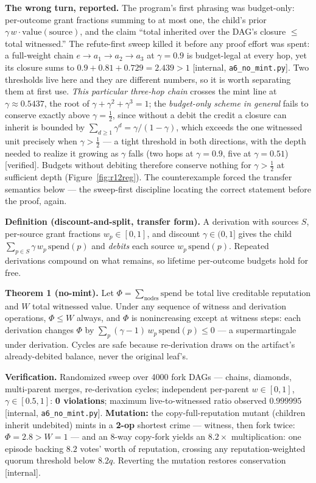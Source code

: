 \documentclass[11pt,a4paper]{article}
\begin{document}
\textbf{The wrong turn, reported.} The program's first phrasing was budget-only: per-outcome grant fractions summing to at most
one, the child's prior $\gamma\, w\cdot\mathrm{value}(\text{source})$, and the claim ``total inherited over the DAG's closure
$\le$ total witnessed.'' The refute-first sweep killed it before any proof effort was spent: a full-weight chain
$e\to a_1\to a_2\to a_3$ at $\gamma=0.9$ is budget-legal at every hop, yet its closure sums to $0.9+0.81+0.729=2.439>1$ [internal,
\texttt{a6\_no\_mint.py}]. Two thresholds live here and they are different numbers, so it is worth separating them at first use.
\emph{This particular three-hop chain} crosses the mint line at $\gamma\approx0.5437$, the root of $\gamma+\gamma^2+\gamma^3=1$;
the \emph{budget-only scheme in general} fails to conserve exactly above $\gamma=\tfrac12$, since without a debit the credit a
closure can inherit is bounded by $\sum_{d\ge1}\gamma^d=\gamma/(1-\gamma)$, which exceeds the one witnessed unit precisely when
$\gamma>\tfrac12$ --- a tight threshold in both directions, with the depth needed to realize it growing as $\gamma$ falls (two hops
at $\gamma=0.9$, five at $\gamma=0.51$) [verified]. Budgets without debiting therefore conserve nothing for $\gamma>\tfrac12$ at
sufficient depth (Figure~\ref{fig:r12reg}). The counterexample forced the transfer
semantics below --- the sweep-first discipline locating the correct statement before the proof, again.

\begin{thebox}
\textbf{Definition (discount-and-split, transfer form).} A derivation with sources $S$, per-source grant fractions $w_p\in[0,1]$,
and discount $\gamma\in(0,1]$ gives the child $\sum_{p\in S}\gamma\,w_p\,\mathrm{spend}(p)$ and \emph{debits} each source
$w_p\,\mathrm{spend}(p)$. Repeated derivations compound on what remains, so lifetime per-outcome budgets hold for free.

\textbf{Theorem 1 (no-mint).} Let $\Phi=\sum_{\text{nodes}}\mathrm{spend}$ be total live creditable reputation and $W$ total
witnessed value. Under any sequence of witness and derivation operations, $\Phi\le W$ always, and $\Phi$ is nonincreasing except at
witness steps: each derivation changes $\Phi$ by $\sum_p(\gamma-1)\,w_p\,\mathrm{spend}(p)\le 0$ --- a supermartingale under
derivation. Cycles are safe because re-derivation draws on the artifact's already-debited balance, never the original leaf's.

\textbf{Verification.} Randomized sweep over 4000 fork DAGs --- chains, diamonds, multi-parent merges, re-derivation cycles;
independent per-parent $w\in[0,1]$, $\gamma\in[0.5,1]$: \textbf{0 violations}; maximum live-to-witnessed ratio observed $0.999995$
[internal, \texttt{a6\_no\_mint.py}]. \textbf{Mutation:} the copy-full-reputation mutant (children inherit undebited) mints in a
\textbf{2-op} shortest crime --- witness, then fork twice: $\Phi=2.8>W=1$ --- and an 8-way copy-fork yields an $8.2\times$
multiplication: one episode backing $8.2$ votes' worth of reputation, crossing any reputation-weighted quorum threshold below
$8.2q$. Reverting the mutation restores conservation [internal].
\end{thebox}
\end{document}
